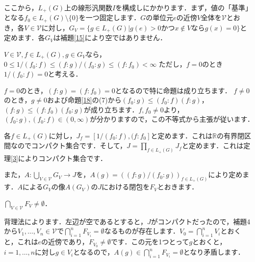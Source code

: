 ここから，$L_{+}(G)$上の線形汎関数$I$を構成しにかかります．まず，値の「基準」となる$f_{0} \in L_{+}(G) \setminus \{ 0 \}$を一つ固定します．$G$の単位元$e$の近傍$V$全体を$\mathscr{V}$とおき，各$V \in \mathscr{V}$に対し，$G_{V}=\{ g \in L_{+}(G) | g(e)>0 かつ x \not\in V ならg(x)=0 \}$と定めます．各$G_V$は補題\ref{15}により空ではありません．

\begin{prop}\label{19}
$V \in \mathscr{V}, f \in L_{+}(G), g \in G_{V}$なら，$0 \le 1/( f_0 \colon f ) \le ( f \colon g ) / ( f_0 \colon g ) \le ( f \colon f_0 ) < \infty$
ただし，$f=0$のとき$1/( f_0 \colon f ) = 0$と考える．
\end{prop}
\begin{Proof}
$f=0$のとき，$( f \colon g ) = ( f \colon f_0 ) = 0$となるので特に命題は成り立ちます．
$f \ne 0$のとき，$g \neq 0$および命題\ref{18}の(7)から$(f_0 \colon g) \le (f_0 \colon f) (f \colon g )$，$ (f \colon g) \le (f \colon f_0 ) (f_0 \colon g )$が成り立ちます．$f, f_0 \neq 0$より，$(f_0 \colon g), (f_0 \colon f) \in (0, \infty)$が分かりますので，この不等式から主張が従います．　
\end{Proof}

各$f \in L_{+}(G)$に対し，$J_{f}=[1/ ( f_0 \colon f ) , ( f \colon f_{0} ]$と定めます．これは$\mathbb{R}$の有界閉区間なのでコンパクト集合です．そして，$J=\prod_{f \in L_{+}(G)} J_f$と定めます．これは定理\ref{3}によりコンパクト集合です．

また，$A \colon \bigcup_{V \in \mathscr{V}}G_V \to J$を，$A(g)=( ( f \colon g ) / ( f_0 \colon g ) )_{f \in L_{+}(G)}$により定めます．$A$による$G_V$の像$A(G_V)$の$J$における閉包を$F_V$とおきます．
\begin{prop}\label{20}
$\bigcap_{V \in \mathscr{V}}F_V \neq \emptyset$．
\end{prop}
\begin{Proof}
背理法によります．左辺が空であるとすると，$J$がコンパクトだったので，補題4から$V_1, \ldots , V_n \in \mathscr{V}$で$\bigcap_{i=1}^{n}F_{V_i}=\emptyset$なるものが存在します．$V_0=\bigcap_{i=1}^{n}V_i$とおくと，これは$e$の近傍であり，$F_{V_0} \neq \emptyset$です．この元を1つとって$g$とおくと，$i=1, \ldots , n$に対し$g \in V_i$となるので，$A(g) \in \bigcap_{i=1}^{n}F_{V_i}=\emptyset$となり矛盾します．　
\end{Proof}

